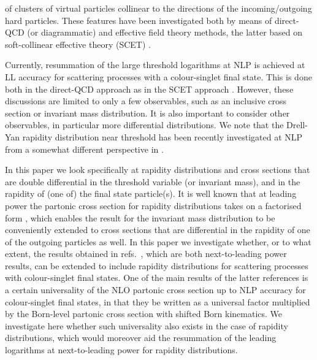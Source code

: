 \documentclass[11pt]{article}
\begin{document}
of clusters of virtual particles collinear 
to the directions of the incoming/outgoing 
hard particles.
These features have been investigated
both by means of direct-QCD (or diagrammatic) 
\cite{Laenen:2008ux,Laenen:2008gt,Laenen:2010uz,Bonocore:2015esa,Bonocore:2016awd,DelDuca:2017twk,Gervais:2017yxv,Bahjat-Abbas:2018hpv,vanBeekveld:2019prq,Laenen:2020nrt,Bonocore:2020xuj,Bonocore:2021qxh,Bonocore:2021cbv,Agarwal:2023fdk,Ajjath:2020ulr,Ajjath:2020sjk,Ajjath:2020lwb,Ajjath:2022kyb,Engel:2021ccn,Engel:2023ifn,Czakon:2023tld}
and effective field theory methods, the latter 
based on soft-collinear effective theory (SCET)
\cite{Larkoski:2014bxa,Moult:2016fqy,Moult:2017rpl,Moult:2017jsg,Ebert:2018lzn,Moult:2019mog,Moult:2019uhz,Beneke:2017ztn,Beneke:2018rbh,Beneke:2019kgv,Beneke:2019oqx,Broggio:2021fnr,Broggio:2023pbu}.

Currently, resummation of the large threshold 
logarithms at NLP is achieved at LL accuracy 
for scattering processes with a colour-singlet 
final state. This is done both in the direct-QCD 
approach \cite{Bahjat-Abbas:2019fqa,vanBeekveld:2019cks,vanBeekveld:2021hhv,vanBeekveld:2021mxn,Ajjath:2021pre,Ajjath:2021lvg,Ajjath:2021bbm,Czakon:2023tld}
as in the SCET approach \cite{Moult:2018jjd,Beneke:2018gvs,Beneke:2019mua,Beneke:2020ibj,Beneke:2022obx}. However, these discussions are 
limited to only a few observables, such as an 
inclusive cross section or invariant mass 
distribution. It is also important to consider 
other observables, in particular more 
differential distributions. We note that 
the Drell-Yan rapidity distribution near 
threshold has been recently investigated 
at NLP from a somewhat different perspective 
in \cite{Ajjath:2020lwb,Ajjath:2021pre}.

In this paper we look specifically at rapidity 
distributions and cross sections that are 
double differential in the threshold variable 
(or invariant mass), and in the rapidity of 
(one of) the final state particle(s). It is 
well known that at leading power the partonic 
cross section for rapidity distributions takes 
on a factorised form \cite{Laenen:1992ey,Bolzoni:2006ky,Bonvini:2010tp,Bonvini:2012sh,Bonvini:2023mfj}, 
which enables the result for the invariant 
mass distribution to be conveniently extended 
to cross sections that are differential in the 
rapidity of one of the outgoing particles as well. 
In this paper we investigate whether, or to what 
extent, the results obtained in 
refs.~\cite{DelDuca:2017twk,Bahjat-Abbas:2019fqa}, 
which are both next-to-leading power results, can 
be extended to include rapidity distributions for 
scattering processes with colour-singlet final 
states. One of the main results of the latter 
references is a certain  universality of the 
NLO partonic cross section up to NLP accuracy 
for colour-singlet final states, in that they 
be written as a universal factor multiplied by 
the Born-level partonic cross section with 
shifted Born kinematics. We investigate here 
whether such universality also exists in the 
case of rapidity distributions, which would 
moreover aid the resummation of the leading 
logarithms at next-to-leading power for 
rapidity distributions.
\end{document}

